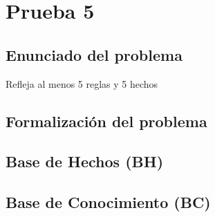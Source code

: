 \section{Prueba 5}
\subsection{Enunciado del problema}
Refleja al menos 5 reglas y 5 hechos

\subsection{Formalización del problema}

\subsection{Base de Hechos (BH)}

\subsection{Base de Conocimiento (BC)}
